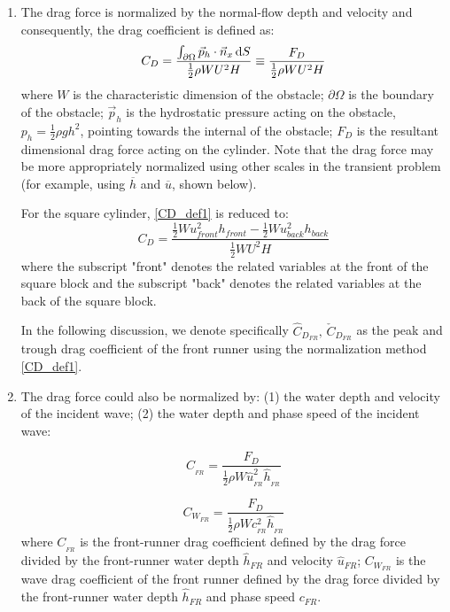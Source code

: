 \documentclass{jfm}
\begin{document}
\begin{enumerate}
	\item  The drag force is normalized by the normal-flow depth and velocity and consequently, the drag coefficient is defined as:
\begin{equation}
	C_D=\frac{\int_{\partial \Omega} \vec{p}_h \cdot \vec{n}_x \,{\rm{d}}S }{\frac{1}{2}\rho W U^2 H}\equiv \frac{F_D}{\frac{1}{2}\rho W U^2 H}
	\label{CD_def1}
\end{equation}
where $W$ is the characteristic dimension of the obstacle; $\partial \Omega$ is the boundary of the obstacle; $\vec{p}_h$ is the hydrostatic pressure acting on the obstacle, $p_h=\frac{1}{2}\rho g h^2$, pointing towards the internal of the obstacle; $F_D$ is the resultant dimensional drag force acting on the cylinder. Note that the drag force may be more appropriately normalized using other scales in the transient problem (for example, using $\overline{h}$ and $\overline{u}$, shown below).

For the square cylinder, \autoref{CD_def1} is reduced to:
\begin{equation}
	C_D=\frac{\frac{1}{2} W u_{front}^2 h_{front}- \frac{1}{2} W u_{back}^2 h_{back}}{\frac{1}{2} W U^2 H}
	\label{CD_def_square}
\end{equation}
where the subscript "front" denotes the related variables at the front of the square block and the subscript "back" denotes the related variables at the back of the square block.

In the following discussion, we denote specifically $\hat{C}_{D_{FR}},\, \check{C}_{D_{FR}}$ as the peak and trough drag coefficient of the front runner using the normalization method \autoref{CD_def1}.

	\item The drag force could also be normalized by: (1) the water depth and velocity of the  incident wave; (2) the water depth and phase speed of the  incident wave:

\begin{equation}
	{C} _{_{FR}}=\frac{F_{D}}{\frac{1}{2}\rho W \hat{u}_{_{FR}}^2 \hat{h}_{_{FR}}
	\label{CD_FR_def2}}
\end{equation}

\begin{equation}
	{C} _{W_{FR}}=\frac{F_{D}}{\frac{1}{2}\rho W c_{_{FR}}^2 \hat{h}_{_{FR}}}
	\label{CD_FR_def3}
\end{equation}
where ${C} _{_{FR}}$ is the front-runner drag coefficient defined by the drag force divided by the front-runner water depth $\hat{h}_{FR}$ and velocity $\hat{u}_{FR}$; ${C} _{W_{FR}}$ is the wave drag coefficient of the front runner defined by the drag force divided by the front-runner water depth $\hat{h}_{FR}$ and phase speed ${c}_{FR}$.

\end{enumerate}
\end{document}
